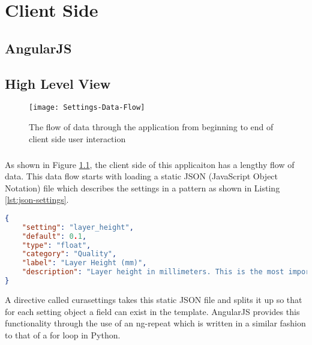 \chapter{Client Side}

\section{AngularJS}

\section{High Level View}
\begin{figure}[!ht]
  \centering
  \texttt{[image: Settings-Data-Flow]}
  \caption{The flow of data through the application from beginning to end of client side user interaction}
  \label{fig:settings-data-flow}
\end{figure}

\paragraph{}
As shown in Figure \ref{fig:settings-data-flow}, the client side of this applicaiton has a lengthy flow of data.
This data flow starts with loading a static JSON (JavaScript Object Notation) file which describes the settings in a pattern as shown in Listing \ref{lst:json-settings}.

\begin{lstlisting}[language=json, label={lst:json-settings}, caption=A sample from a static settings file in JSON format.]
{
    "setting": "layer_height",
    "default": 0.1,
    "type": "float",
    "category": "Quality",
    "label": "Layer Height (mm)",
    "description": "Layer height in millimeters. This is the most important setting to determine the quality of your print. Normal quality prints are 0.1mm, high quality is 0.06mm. You can go up to 0.25mm."
}
\end{lstlisting}

A directive called curasettings takes this static JSON file and splits it up so that for each setting object a field can exist in the template.
AngularJS provides this functionality through the use of an ng-repeat which is written in a similar fashion to that of a for loop in Python.

